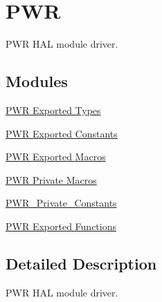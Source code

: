 \hypertarget{group___p_w_r}{}\section{P\+WR}
\label{group___p_w_r}


P\+WR H\+AL module driver.  


\subsection*{Modules}
\begin{DoxyCompactItemize}
\item 
\hyperlink{group___p_w_r___exported___types}{P\+W\+R Exported Types}
\item 
\hyperlink{group___p_w_r___exported___constants}{P\+W\+R Exported Constants}
\item 
\hyperlink{group___p_w_r___exported___macros}{P\+W\+R Exported Macros}
\item 
\hyperlink{group___p_w_r___private___macros}{P\+W\+R Private Macros}
\item 
\hyperlink{group___p_w_r___private___constants}{P\+W\+R\+\_\+\+Private\+\_\+\+Constants}
\item 
\hyperlink{group___p_w_r___exported___functions}{P\+W\+R Exported Functions}
\end{DoxyCompactItemize}


\subsection{Detailed Description}
P\+WR H\+AL module driver. 

